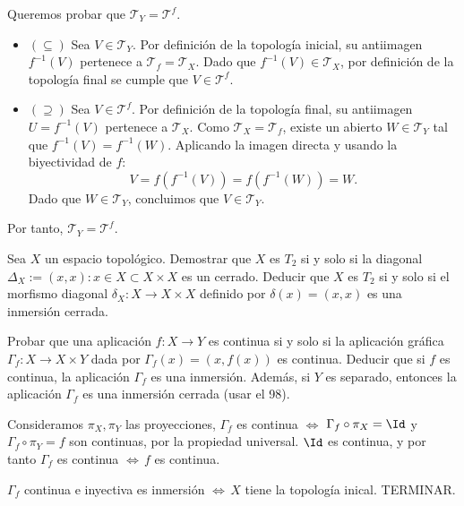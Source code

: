 \begin{sol}
\begin{itemize}
\begin{itemize}
        Queremos probar que $\mathcal{T}_Y = \mathcal{T}^f$.
        \begin{itemize}
            \item $(\subseteq)$ Sea $V \in \mathcal{T}_Y$. Por definición de la topología inicial, su antiimagen $f^{-1}(V)$ pertenece a $\mathcal{T}_f = \mathcal{T}_X$. Dado que $f^{-1}(V) \in \mathcal{T}_X$, por definición de la topología final se cumple que $V \in \mathcal{T}^f$.
            \item $(\supseteq)$ Sea $V \in \mathcal{T}^f$. Por definición de la topología final, su antiimagen $U = f^{-1}(V)$ pertenece a $\mathcal{T}_X$. Como $\mathcal{T}_X = \mathcal{T}_f$, existe un abierto $W \in \mathcal{T}_Y$ tal que $f^{-1}(V) = f^{-1}(W)$. Aplicando la imagen directa y usando la biyectividad de $f$:
            \[
                V = f(f^{-1}(V)) = f(f^{-1}(W)) = W.
            \]
            Dado que $W \in \mathcal{T}_Y$, concluimos que $V \in \mathcal{T}_Y$.
        \end{itemize}
        Por tanto, $\mathcal{T}_Y = \mathcal{T}^f$.
                \end{itemize}
        \end{itemize}
\end{sol}
\begin{ejer}
    [98] Sea $X$ un espacio topológico. Demostrar que $X$ es $T_2$ si y solo si la diagonal $\Delta_X := {(x,x): x \in X} \subset X\times X$ es un cerrado. Deducir que $X$ es $T_2$ si y solo si el morfismo diagonal $\delta_X: X \longrightarrow X \times X$ definido por $\delta(x) = (x, x)$ es una inmersión cerrada.
\end{ejer}
\begin{ejer}
    [99] Probar que una aplicación $f : X \to Y$ es continua si y solo si la aplicación gráfica $\Gamma_f : X \to X \times Y$ dada por $\Gamma_f(x) = (x, f(x))$ es continua. Deducir que si $f$ es continua, la aplicación $\Gamma_f$ es una inmersión. Además, si $Y$ es separado, entonces la aplicación $\Gamma_f$ es una inmersión cerrada (usar el 98).
\end{ejer}
\begin{sol}
    Consideramos $\pi_X, \pi_Y$ las proyecciones, $\Gamma_f$ es continua $\iff$ $\Gamma_f \circ \pi_X = \Id$ y $\Gamma_f \circ \pi_Y = f$ son continuas, por la propiedad universal. $\Id$ es continua, y por tanto $\Gamma_f$ es continua $\iff \, f$ es continua.
    
    $\Gamma_f$ continua e inyectiva es inmersi\'on $\iff \, X $ tiene la topolog\'ia inical. TERMINAR.  
\end{sol}
